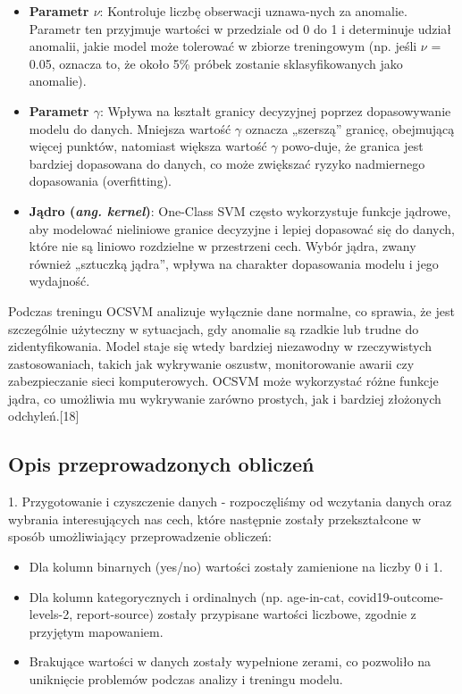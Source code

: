 \documentclass[a4paper,fleqn]{cas-dc}
\begin{document}
\begin{itemize}
    \item \textbf{Parametr $\nu$}: Kontroluje liczbę obserwacji uznawa-nych za anomalie. Parametr ten przyjmuje wartości w przedziale od 0 do 1 i determinuje udział anomalii, jakie model może tolerować w zbiorze treningowym (np. jeśli $\nu$ = 0.05, oznacza to, że około 5\% próbek zostanie sklasyfikowanych jako anomalie).
    \item \textbf{Parametr $\gamma$}: Wpływa na kształt granicy decyzyjnej poprzez dopasowywanie modelu do danych. Mniejsza wartość $\gamma$ oznacza „szerszą” granicę, obejmującą więcej punktów, natomiast większa wartość $\gamma$ powo-duje, że granica jest bardziej dopasowana do danych, co może zwiększać ryzyko nadmiernego dopasowania (overfitting).
    \item \textbf{Jądro (\textit{ang. kernel})}: One-Class SVM często wykorzystuje funkcje jądrowe, aby modelować nieliniowe granice decyzyjne i lepiej dopasować się do danych, które nie są liniowo rozdzielne w przestrzeni cech. Wybór jądra, zwany również „sztuczką jądra”, \break wpływa na charakter dopasowania modelu i jego wydajność.
\end{itemize}

Podczas treningu OCSVM analizuje wyłącznie dane normalne, co sprawia, że jest szczególnie użyteczny w sytuacjach, gdy anomalie są rzadkie lub trudne do zidentyfikowania. Model staje się wtedy bardziej niezawodny w rzeczywistych zastosowaniach, takich jak wykrywanie oszustw, monitorowanie awarii czy zabezpieczanie sieci komputerowych. OCSVM może wykorzystać różne funkcje jądra, co umożliwia mu wykrywanie zarówno prostych, jak i bardziej złożonych odchyleń.[18]

\subsection{Opis przeprowadzonych obliczeń}

1. Przygotowanie i czyszczenie danych - rozpoczęliśmy od wczytania danych oraz wybrania interesujących nas cech, które następnie zostały przekształcone w sposób umożliwiający przeprowadzenie obliczeń:
\begin{itemize} 
\item Dla kolumn binarnych (yes/no) wartości zostały zamienione na liczby 0 i 1.
\item  Dla kolumn kategorycznych i ordinalnych (np. age-in-cat, covid19-outcome-levels-2, report-source) zostały przypisane wartości liczbowe, zgodnie z przyjętym mapowaniem.
 \item Brakujące wartości w danych zostały wypełnione zerami, co pozwoliło na uniknięcie problemów podczas analizy i treningu modelu.
\end{itemize}
\end{document}
